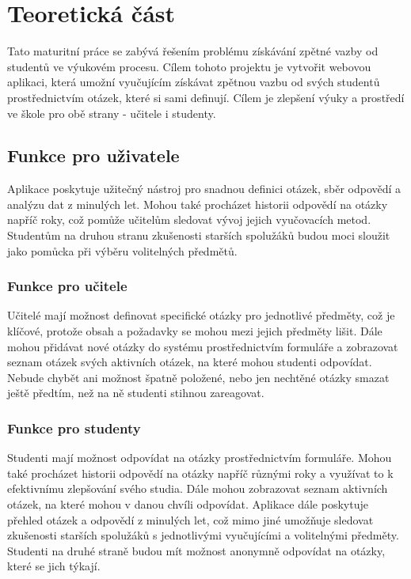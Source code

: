 \documentclass[11pt,a4paper,twoside,openright]{report}
\begin{document}


\setcounter{tocdepth}{2}
\tableofcontents

\chapter{Teoretická část}
\pagestyle{fancy}

Tato maturitní práce se zabývá řešením problému získávání zpětné vazby od studentů ve výukovém procesu. Cílem tohoto projektu je vytvořit webovou aplikaci, která umožní vyučujícím získávat zpětnou vazbu od svých studentů prostřednictvím otázek, které si sami definují. Cílem je zlepšení výuky a prostředí ve škole pro obě strany - učitele i studenty.

\section{Funkce pro uživatele}

Aplikace poskytuje užitečný nástroj pro snadnou definici otázek, sběr odpovědí a analýzu dat z minulých let. Mohou také procházet historii odpovědí na otázky napříč roky, což pomůže učitelům sledovat vývoj jejich vyučovacích metod. Studentům na druhou stranu zkušenosti starších spolužáků budou moci sloužit jako pomůcka při výběru volitelných předmětů.

\subsection{Funkce pro učitele}

Učitelé mají možnost definovat specifické otázky pro jednotlivé předměty, což je klíčové, protože obsah a požadavky se mohou mezi jejich předměty lišit. Dále mohou přidávat nové otázky do systému prostřednictvím formuláře a zobrazovat seznam otázek svých aktivních otázek, na které mohou studenti odpovídat. Nebude chybět ani možnost špatně položené, nebo jen nechtěné otázky smazat ještě předtím, než na ně studenti stihnou zareagovat.

\subsection{Funkce pro studenty}

Studenti mají možnost odpovídat na otázky prostřednictvím formuláře. Mohou také procházet historii odpovědí na otázky napříč různými roky a využívat to k efektivnímu zlepšování svého studia. Dále mohou zobrazovat seznam aktivních otázek, na které mohou v danou chvíli odpovídat. Aplikace dále poskytuje přehled otázek a odpovědí z minulých let, což mimo jiné umožňuje sledovat zkušenosti starších spolužáků s jednotlivými vyučujícími a volitelnými předměty. Studenti na druhé straně budou mít možnost anonymně odpovídat na otázky, které se jich týkají.
\end{document}
